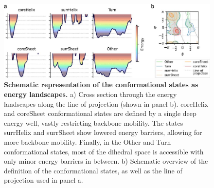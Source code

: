 \begin{figure}[H]
    \centering
    \includegraphics[width=1\linewidth]{constava//sup_figs/supfig12.pdf}
    \caption{\textbf{Schematic representation of the conformational states as energy landscapes.} a) Cross section through the energy landscapes along the line of projection (shown in panel b). coreHelix and coreSheet conformational states are defined by a single deep energy well, vastly restricting backbone mobility. The states surrHelix and surrSheet show lowered energy barriers, allowing for more backbone mobility. Finally, in the Other and Turn conformational states, most of the dihedral space is accessible with only minor energy barriers in between. b) Schematic overview of the definition of the conformational states, as well as the line of projection used in panel a.}
    \label{fig:sup_fig_constava:2d_landscape}
\end{figure}

